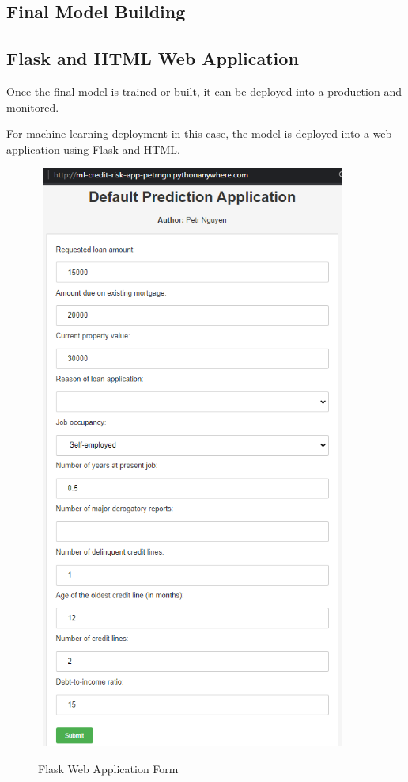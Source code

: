 \subsection{Final Model Building}
\subsection{Flask and HTML Web Application}
Once the final model is trained or built, it can be deployed into a production and monitored.

For machine learning deployment in this case, the model is deployed into a web application using Flask and HTML. 

\begin{figure}[H]
    \centering
    \caption{Flask Web Application Form}\vspace{0.5em}
    \label{fig:shap}\
    \includegraphics[width=100mm]{Figures/flask_app_form.jpg}

    \vspace{-1em}
\end{figure}


